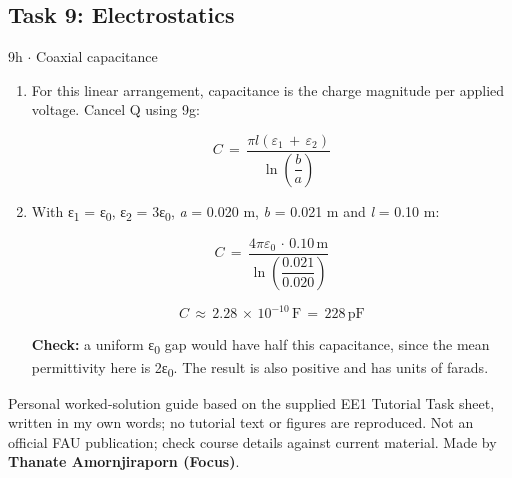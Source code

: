 \documentclass[11pt]{article}
\begin{document}
\begin{keepsection}\subsection{Task 9: Electrostatics}

\begin{workedbox}{9h \ensuremath{\cdot} Coaxial capacitance}
\begin{enumerate}
\item {}
For this linear arrangement, capacitance is the charge magnitude per applied voltage. Cancel Q using 9g:

\begin{equation*}{C}\, =\, \dfrac{π{l}(ε_{1}\, +\, ε_{2})}{\ln \left(\dfrac{{b}}{{a}}\right)}\end{equation*}
\item {}
With ε\textsubscript{1} = ε\textsubscript{0}, ε\textsubscript{2} = 3ε\textsubscript{0}, \textit{a} = 0.020 m, \textit{b} = 0.021 m and \textit{l} = 0.10 m:

\begin{equation*}{C}\, =\, \dfrac{4πε_{0}\, \cdot \, 0.10\, \mathrm{m}}{\ln \left(\dfrac{0.021}{0.020}\right)}\end{equation*}

\begin{equation*}{C}\, \approx \, 2.28\, \times \, 10^{-10}\, \mathrm{F}\, =\, 228\, \text{pF}\end{equation*}

\textbf{Check:} a uniform ε\textsubscript{0} gap would have half this capacitance, since the mean permittivity here is 2ε\textsubscript{0}. The result is also positive and has units of farads.
\end{enumerate}
\end{workedbox}

\end{keepsection}

\vfill{\small Personal worked-solution guide based on the supplied EE1 Tutorial Task sheet, written in my own words; no tutorial text or figures are reproduced. Not an official FAU publication; check course details against current material. Made by \textbf{Thanate Amornjiraporn (Focus)}.}
\end{document}

